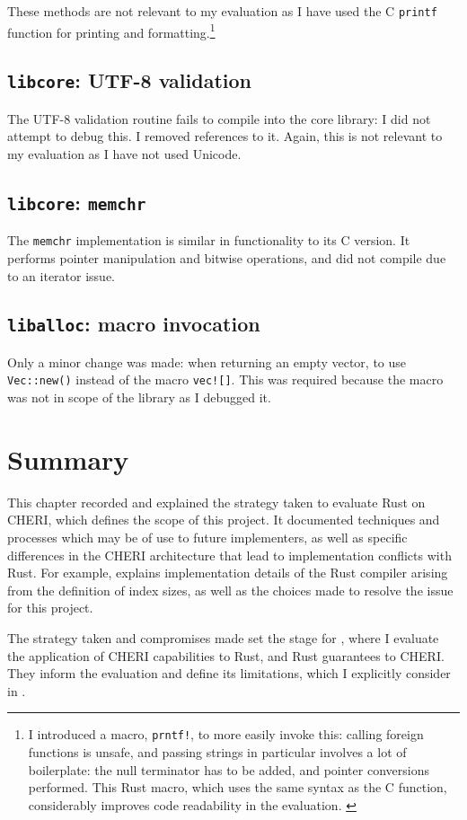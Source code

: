 \documentclass[dissertation.tex]{subfiles}
\begin{document}
These methods are not relevant to my evaluation as I have used the C
\texttt{printf} function for printing and formatting.\footnote{
I introduced a macro, \texttt{prntf!}, to more easily invoke this:
calling foreign functions is unsafe, and passing strings in particular
involves a lot of boilerplate: the null terminator has to be added, and
pointer conversions performed.
This Rust macro, which uses the same syntax as the C function,
considerably improves code readability in the evaluation.
\label{foot:prntf}
}


\subsection{\texttt{libcore}: UTF-8 validation}
The UTF-8 validation routine fails to compile into the core library: I
did not attempt to debug this.
I removed references to it.
Again, this is not relevant to my evaluation as I have not used Unicode.


\subsection{\texttt{libcore}: \texttt{memchr}}
The \texttt{memchr} implementation is similar in functionality to its C
version.
It performs pointer manipulation and bitwise operations, and did not
compile due to an iterator issue.


\subsection{\texttt{liballoc}: macro invocation}
Only a minor change was made: when returning an empty vector, to use
\texttt{Vec::new()} instead of the macro \texttt{vec![]}.
This was required because the macro was not in scope of the library as I
debugged it.


\section{Summary}

This chapter recorded and explained the strategy taken to evaluate Rust
on CHERI, which defines the scope of this project.
It documented techniques and processes which may be of use to future
implementers, as well as specific differences in the CHERI architecture
that lead to implementation conflicts with Rust.
For example,  explains implementation details of
the Rust compiler arising from the definition of index sizes, as well as
the choices made to resolve the issue for this project.

The strategy taken and compromises made set the stage for
, where I evaluate the application of CHERI capabilities
to Rust, and Rust guarantees to CHERI.
They inform the evaluation and define its limitations, which I
explicitly consider in .
\end{document}
